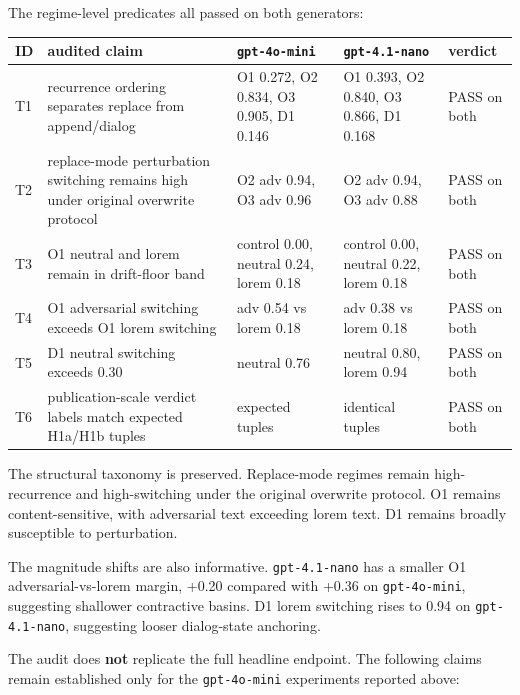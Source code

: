 \documentclass{article}
\theoremstyle{plain}
\theoremstyle{definition}
\begin{document}
The regime-level predicates all passed on both generators:

\begin{table}[h!]
\centering
\small
\begin{tabularx}{\textwidth}{lYYYY}
\toprule
ID & audited claim & \texttt{gpt-4o-mini} & \texttt{gpt-4.1-nano} & verdict \\
\midrule
T1 & recurrence ordering separates replace from append/dialog & O1 0.272, O2 0.834, O3 0.905, D1 0.146 & O1 0.393, O2 0.840, O3 0.866, D1 0.168 & PASS on both \\
T2 & replace-mode perturbation switching remains high under original overwrite protocol & O2 adv 0.94, O3 adv 0.96 & O2 adv 0.94, O3 adv 0.88 & PASS on both \\
T3 & O1 neutral and lorem remain in drift-floor band & control 0.00, neutral 0.24, lorem 0.18 & control 0.00, neutral 0.22, lorem 0.18 & PASS on both \\
T4 & O1 adversarial switching exceeds O1 lorem switching & adv 0.54 vs lorem 0.18 & adv 0.38 vs lorem 0.18 & PASS on both \\
T5 & D1 neutral switching exceeds 0.30 & neutral 0.76 & neutral 0.80, lorem 0.94 & PASS on both \\
T6 & publication-scale verdict labels match expected H1a/H1b tuples & expected tuples & identical tuples & PASS on both \\
\bottomrule
\end{tabularx}
\end{table}

The structural taxonomy is preserved. Replace-mode regimes remain high-recurrence and high-switching under the original overwrite protocol. O1 remains content-sensitive, with adversarial text exceeding lorem text. D1 remains broadly susceptible to perturbation.

The magnitude shifts are also informative. \texttt{gpt-4.1-nano} has a smaller O1 adversarial-vs-lorem margin, +0.20 compared with +0.36 on \texttt{gpt-4o-mini}, suggesting shallower contractive basins. D1 lorem switching rises to 0.94 on \texttt{gpt-4.1-nano}, suggesting looser dialog-state anchoring.

The audit does \textbf{not} replicate the full headline endpoint. The following claims remain established only for the \texttt{gpt-4o-mini} experiments reported above:
\end{document}
